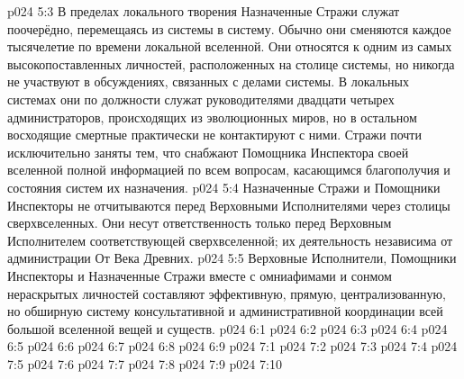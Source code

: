 \vs p024 5:3 В пределах локального творения Назначенные Стражи служат поочерёдно, перемещаясь из системы в систему. Обычно они сменяются каждое тысячелетие по времени локальной вселенной. Они относятся к одним из самых высокопоставленных личностей, расположенных на столице системы, но никогда не участвуют в обсуждениях, связанных с делами системы. В локальных системах они по должности служат руководителями двадцати четырех администраторов, происходящих из эволюционных миров, но в остальном восходящие смертные практически не контактируют с ними. Стражи почти исключительно заняты тем, что снабжают Помощника Инспектора своей вселенной полной информацией по всем вопросам, касающимся благополучия и состояния систем их назначения.
\vs p024 5:4 Назначенные Стражи и Помощники Инспекторы не отчитываются перед Верховными Исполнителями через столицы сверхвселенных. Они несут ответственность только перед Верховным Исполнителем соответствующей сверхвселенной; их деятельность независима от администрации От Века Древних.
\vs p024 5:5 \pc Верховные Исполнители, Помощники Инспекторы и Назначенные Стражи вместе с омниафимами и сонмом нераскрытых личностей составляют эффективную, прямую, централизованную, но обширную систему консультативной и административной координации всей большой вселенной вещей и существ.
\vs p024 6:1 
\vs p024 6:2 
\vs p024 6:3 
\vs p024 6:4 \pc 
\vs p024 6:5 
\vs p024 6:6 
\vs p024 6:7 
\vs p024 6:8 \pc 
\vs p024 6:9 \pc 
{}
\vs p024 7:1 
\vs p024 7:2 
\vs p024 7:3 
\vs p024 7:4 \pc 
\vs p024 7:5 
\vs p024 7:6 
\vs p024 7:7 \pc 
\vs p024 7:8 \pc 
\vs p024 7:9 
\vsetoff
\vs p024 7:10 
\quizlink
